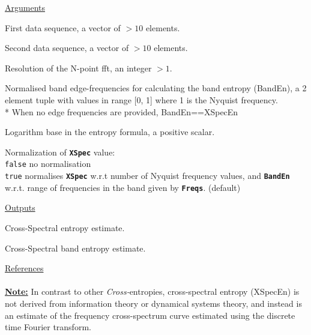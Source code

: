 \documentclass[12pt, a4paper, titlepage, openany]{book}
\begin{document}
\noindent \ul{Arguments}
\begin{description}[labelsep=1cm, labelwidth=2cm, nosep, style=multiline,leftmargin=3cm]\footnotesize
\item[\texttt{Sig1}]	First data sequence, a vector of $>10$ elements.
\item[\texttt{Sig2}]	Second data sequence, a vector of $>10$ elements.
\item[\texttt{N}]		Resolution of the N-point fft, an integer $> 1$.
\item[\texttt{Freqs}]	Normalised band edge-frequencies for calculating the band entropy (BandEn), a 2 element tuple with values in range [0, 1] where 1 is the Nyquist frequency. \\
		* When no edge frequencies are provided, BandEn==XSpecEn
\item[\texttt{Logx}]	Logarithm base in the entropy formula, a positive scalar.
\item[\texttt{Norm}]	Normalization of \texttt{\textbf{XSpec}} value:\\
		  \texttt{false} \hspace{10pt} no normalisation \\
		  \texttt{true} \hspace{15pt}  normalises \texttt{\textbf{XSpec}} w.r.t number of Nyquist frequency values, and \texttt{\textbf{BandEn}} w.r.t. range of frequencies in the band given by \texttt{\textbf{Freqs}}. (default)
\end{description}

\noindent \ul{Outputs}
\begin{description}[labelsep=1cm, labelwidth=2cm, nosep, style=multiline,leftmargin=3cm]\footnotesize
\item[\texttt{XSpec}]		Cross-Spectral entropy estimate.
\item[\texttt{BandEn}]		Cross-Spectral band entropy estimate.
\end{description}

\noindent \ul{References}\hspace{1cm}
\cite{Matt1}
\\ \ \\
\noindent\ul{\textbf{Note:}}\hspace{5mm} In contrast to other \textit{Cross-}entropies, cross-spectral entropy (XSpecEn) is not derived from information theory or dynamical systems theory, and instead is an estimate of the frequency cross-spectrum curve estimated using the discrete time Fourier transform.
\end{document}
